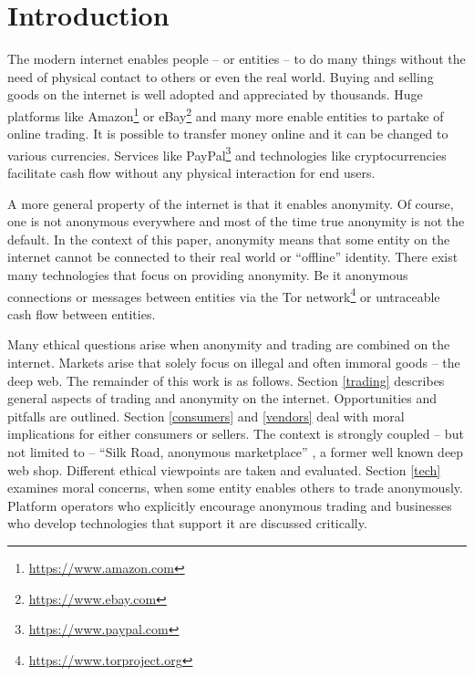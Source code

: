 \section{Introduction}


The modern internet enables people -- or entities -- to do many things without the need of physical contact to others or even the real world. Buying and selling goods on the internet is well adopted and appreciated by thousands. Huge platforms like Amazon\footnote{\url{https://www.amazon.com}} or eBay\footnote{\url{https://www.ebay.com}} and many more enable entities to partake of online trading. It is possible to transfer money online and it can be changed to various currencies. Services like PayPal\footnote{\url{https://www.paypal.com}} and technologies like cryptocurrencies facilitate cash flow without any physical interaction for end users.

A more general property of the internet is that it enables anonymity. Of course, one is not anonymous everywhere and most of the time true anonymity is not the default. In the context of this paper, anonymity means that some entity on the internet cannot be connected to their real world or ``offline'' identity. There exist many technologies that focus on providing anonymity. Be it anonymous connections or messages between entities via the Tor network\footnote{\url{https://www.torproject.org}} or untraceable cash flow between entities.

Many ethical questions arise when anonymity and trading are combined on the internet. Markets arise that solely focus on illegal and often immoral goods -- the deep web. The remainder of this work is as follows. Section \ref{trading} describes general aspects of trading and anonymity on the internet. Opportunities and pitfalls are outlined. Section \ref{consumers} and \ref{vendors} deal with moral implications for either consumers or sellers. The context is strongly coupled -- but not limited to -- ``Silk Road, anonymous marketplace'' \cite{silkroad2013}, a former well known deep web shop. Different ethical viewpoints are taken and evaluated. Section \ref{tech} examines moral concerns, when some entity enables others to trade anonymously. Platform operators who explicitly encourage anonymous trading and businesses who develop technologies that support it are discussed critically.